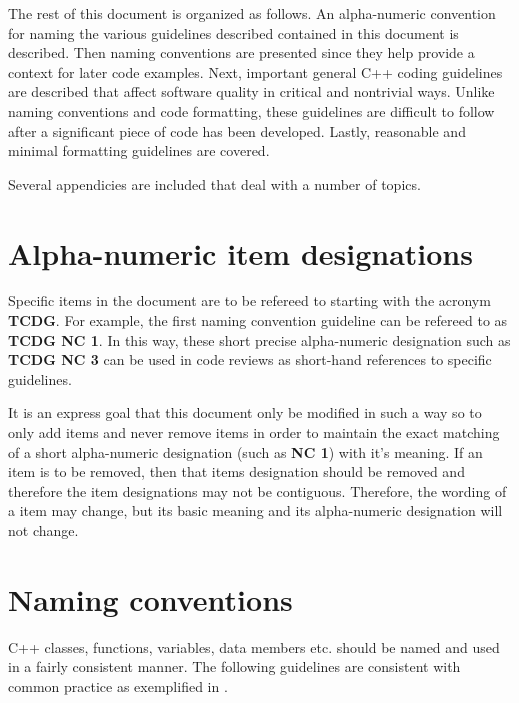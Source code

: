 The rest of this document is organized as follows.  An alpha-numeric
convention for naming the various guidelines described contained in this
document is described.  Then naming conventions are presented since they help
provide a context for later code examples.  Next, important general C++ coding
guidelines are described that affect software quality in critical and
nontrivial ways.  Unlike naming conventions and code formatting, these
guidelines are difficult to follow after a significant piece of code has been
developed.  Lastly, reasonable and minimal formatting guidelines are covered.

Several appendicies are included that deal with a number of topics.

%
\section{Alpha-numeric item designations}
%

Specific items in the document are to be refereed to starting with the acronym
{}\textbf{TCDG}.  For example, the first naming convention guideline can be
refereed to as {}\textbf{TCDG NC 1}.  In this way, these short precise
alpha-numeric designation such as {}\textbf{TCDG NC 3} can be used in code
reviews as short-hand references to specific guidelines.

It is an express goal that this document only be modified in such a way so to
only add items and never remove items in order to maintain the exact matching
of a short alpha-numeric designation (such as {}\textbf{NC 1}) with it's
meaning.  If an item is to be removed, then that items designation should be
removed and therefore the item designations may not be contiguous.  Therefore,
the wording of a item may change, but its basic meaning and its alpha-numeric
designation will not change.

%
\section{Naming conventions}
%

C++ classes, functions, variables, data members etc. should be named and used
in a fairly consistent manner.  The following guidelines are consistent with
common practice as exemplified in {}\cite{EffectiveC++3rd05}.

